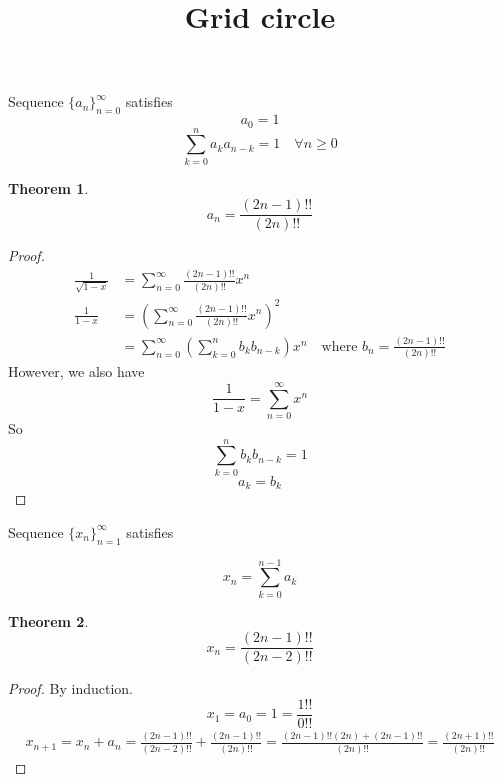 \documentclass[]{article}
\title{Grid circle}
\theoremstyle{definition}\newtheorem{theorem}{Theorem}
\theoremstyle{definition}\newtheorem{lemma}{Lemma}
\begin{document}
\maketitle

Sequence $\{a_n\}_{n=0}^{\infty}$ satisfies
\[
a_0 = 1
\]
\[
\sum_{k=0}^{n}a_k a_{n-k} = 1\quad \forall n\ge 0
\]

\begin{theorem}
	\[
	a_n = \frac{(2n-1)!!}{(2n)!!}
	\]
\end{theorem}
\begin{proof}
\begin{align*}
\frac{1}{\sqrt{1-x}} &= \sum_{n=0}^{\infty}  \frac{(2n-1)!!}{(2n)!!} x^{n}\\
\frac{1}{1-x} &= \left(\sum_{n=0}^{\infty}  \frac{(2n-1)!!}{(2n)!!} x^n\right)^2\\
&=\sum_{n=0}^{\infty} \left(\sum_{k=0}^{n}b_k b_{n-k}\right)x^n\quad\mbox{where } b_n = \frac{(2n-1)!!}{(2n)!!}
\end{align*}
However, we also have
\[
\frac{1}{1-x} = \sum_{n=0}^{\infty} x^n
\]
So
\[
\sum_{k=0}^{n}b_k b_{n-k} = 1
\]
\[
a_k = b_k
\]
\end{proof}

Sequence $\{x_n\}_{n=1}^{\infty}$ satisfies

\[
x_n=\sum_{k=0}^{n-1}a_k
\]

\begin{theorem}
\[
x_n = \frac{(2n-1)!!}{(2n-2)!!}
\]
\end{theorem}
\begin{proof}
By induction.
\[
x_1 = a_0 = 1 = \frac{1!!}{0!!}
\]
\begin{align*}
x_{n+1} = x_n + a_n = \frac{(2n-1)!!}{(2n-2)!!} + \frac{(2n-1)!!}{(2n)!!} = \frac{(2n-1)!!(2n) + (2n-1)!!}{(2n)!!} =  \frac{(2n+1)!!}{(2n)!!}
\end{align*}
\end{proof}
\end{document}
